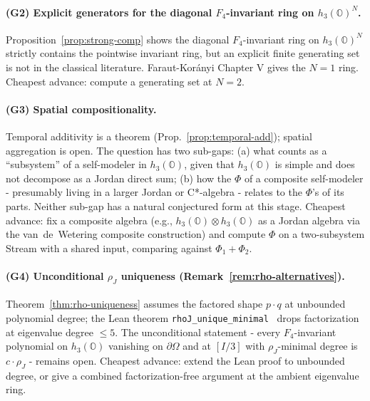 \documentclass[12pt]{article}
\theoremstyle{remark}
\newcommand{\hthree}{h_3(\mathbb{O})}
\newcommand{\Ffour}{F_4}
\newcommand{\rhoJ}{\rho_J}
\newcommand{\Phiexp}{\Phi}
\begin{document}
\paragraph{(G2) Explicit generators for the diagonal
$\Ffour$-invariant ring on $\hthree^N$.}
Proposition~\ref{prop:strong-comp} shows the diagonal
$\Ffour$-invariant ring on $\hthree^N$ strictly contains the
pointwise invariant ring, but an explicit finite generating set is
not in the classical literature. Faraut-Kor\'anyi Chapter V gives
the $N=1$ ring. Cheapest advance: compute a generating set at
$N=2$.

\paragraph{(G3) Spatial compositionality.}
Temporal additivity is a theorem (Prop.~\ref{prop:temporal-add});
spatial aggregation is open. The question has two sub-gaps: (a)
what counts as a ``subsystem'' of a self-modeler in $\hthree$,
given that $\hthree$ is simple and does not decompose as a Jordan
direct sum; (b) how the $\Phiexp$ of a composite self-modeler -
presumably living in a larger Jordan or C*-algebra - relates to
the $\Phiexp$'s of its parts. Neither sub-gap has a natural
conjectured form at this stage. Cheapest advance: fix a composite
algebra (e.g., $\hthree \otimes \hthree$ as a Jordan algebra via
the van~de~Wetering composite construction) and compute $\Phiexp$
on a two-subsystem Stream with a shared input, comparing against
$\Phiexp_1 + \Phiexp_2$.

\paragraph{(G4) Unconditional $\rhoJ$ uniqueness
(Remark~\ref{rem:rho-alternatives}).} Theorem~\ref{thm:rho-uniqueness}
assumes the factored shape $p \cdot q$ at unbounded polynomial degree;
the Lean theorem \texttt{rhoJ\_unique\_minimal}~\cite{lean-rhoj} drops
factorization at eigenvalue degree $\leq 5$. The unconditional
statement - every $\Ffour$-invariant polynomial on $\hthree$ vanishing
on $\partial\Omega$ and at $[I/3]$ with $\rhoJ$-minimal degree is
$c \cdot \rhoJ$ - remains open. Cheapest advance: extend the Lean
proof to unbounded degree, or give a combined factorization-free
argument at the ambient eigenvalue ring.
\end{document}
